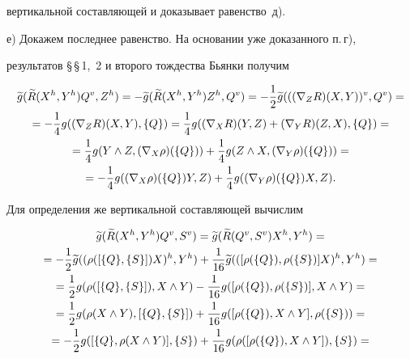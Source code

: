\begin{pf}
вертикальной составляющей и доказывает равенство~д).





е) Докажем последнее равенство. На основании уже доказанного п.\,г),


результатов \S\,\S\,1,~2 и второго тождества Бьянки получим


\begin{multline*}


\g{g}(\g{R}(\gh{X},\gh{Y})\gv{Q},\gh{Z})=-\g{g}(\g{R}(\gh{X},\gh{Y})


\gh{Z},\gv{Q})=-\1\g{g}(\gv{((\n{Z}{R})(X,Y))},\gv{Q})=\\


=-\4 g((\n{Z}{R})(X,Y),\{Q\})=\4 g((\n{X}{R})(Y,Z)+(\n{Y}{R})(Z,X),


\{Q\})=\\


=\4 g(Y\land Z,(\n{X}{\rho})(\{Q\}))+\4 g(Z\land X,(\n{Y}{\rho})(\{Q\}))=\\


=-\4 g((\n{X}{\rho})(\{Q\})Y,Z)+\4 g((\n{Y}{\rho})(\{Q\})X,Z).


\end{multline*}


Для определения же вертикальной составляющей вычислим


\begin{multline*}


\g{g}(\g{R}(\gh{X},\gh{Y})\gv{Q},\gv{S})=


\g{g}(\g{R}(\gv{Q},\gv{S})\gh{X},\gh{Y})=\\


=-\1\g{g}(\gh{(\rho([\{Q\},\{S\}])X)},\gh{Y})+


\6\g{g}(\gh{([\rho(\{Q\}),\rho(\{S\})]X)},\gh{Y})=\\


=\1 g(\rho([\{Q\},\{S\}]),X\land Y)-


\6 g([\rho(\{Q\}),\rho(\{S\})],X\land Y)=\\


=\1 g(\rho(X\land Y),[\{Q\},\{S\}])+


\6 g([\rho(\{Q\}),X\land Y],\rho(\{S\}))=\\


%


=-\1 g([\{Q\},\rho(X\land Y)],\{S\})+


\6 g(\rho([\rho(\{Q\}),X\land Y]),\{S\})=\\


%



\end{multline*}
\end{pf}
